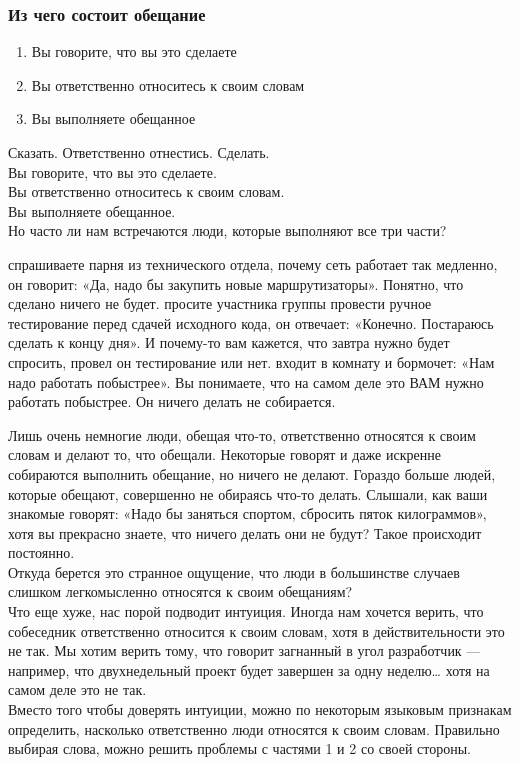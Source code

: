 \documentclass{../industrial-development}
\begin{document}
\begin{frame} \frametitle{Из чего состоит обещание}
\begin{enumerate}
	\item Вы \alert{говорите}, что вы это сделаете
	\item Вы \alert{ответственно относитесь} к своим словам
	\item Вы \alert{выполняете} обещанное
\end{enumerate}
\end{frame}
\lecturenotes
Сказать. Ответственно отнестись. Сделать.\\
Вы говорите, что вы это сделаете.\\
Вы ответственно относитесь к своим словам.\\
Вы выполняете обещанное.\\
Но часто ли нам встречаются люди, которые
выполняют все три части?\\
\begin{itemize}
 спрашиваете парня из технического отдела, почему сеть работает так медленно, он говорит: «Да, надо бы закупить новые маршрутизаторы». Понятно, что сделано ничего не будет.
 просите участника группы провести ручное тестирование перед сдачей исходного кода, он отвечает: «Конечно. Постараюсь сделать к концу дня». И почему-то вам кажется, что завтра нужно будет спросить, провел он тестирование или нет.
 входит в комнату и бормочет: «Нам надо работать побыстрее». Вы понимаете, что на самом деле это ВАМ нужно работать побыстрее. Он ничего делать не собирается.
\end{itemize}
Лишь очень немногие люди, обещая что-то, ответственно относятся к своим словам и делают то, что обещали. Некоторые говорят и даже искренне собираются выполнить обещание, но ничего не делают. Гораздо больше людей, которые обещают, совершенно не  обираясь что-то делать. Слышали, как ваши знакомые говорят: «Надо бы заняться спортом, сбросить пяток килограммов», хотя вы прекрасно знаете, что ничего делать они не будут? Такое происходит постоянно.\\
Откуда берется это странное ощущение, что люди в большинстве случаев слишком легкомысленно относятся к своим обещаниям?\\
Что еще хуже, нас порой подводит интуиция. Иногда нам хочется верить, что собеседник ответственно относится к своим словам, хотя в действительности это не так. Мы хотим верить тому, что говорит загнанный в угол разработчик — например, что двухнедельный проект будет завершен за одну неделю… хотя на самом деле это не так.\\
Вместо того чтобы доверять интуиции, можно по некоторым языковым признакам определить, насколько ответственно люди относятся
к своим словам. Правильно выбирая слова, можно решить проблемы с частями 1 и 2 со своей стороны.
\end{document}
